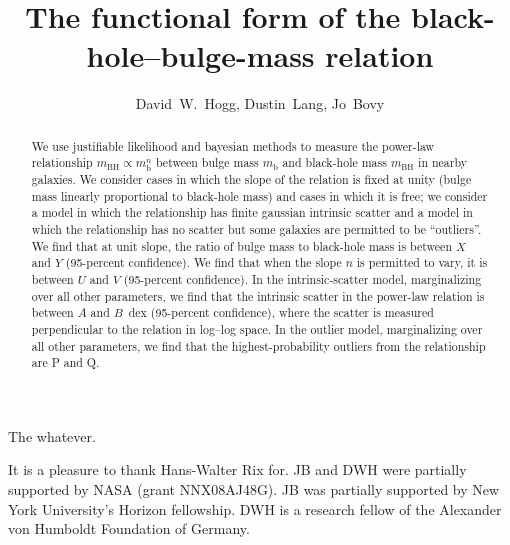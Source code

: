 \documentclass[12pt,preprint]{aastex}
\newcounter{address}
\newcommand{\mbulge}{m_{\mathrm{b}}}
\newcommand{\mbh}{m_{\mathrm{BH}}}
\newcommand{\slope}{n}
\begin{document}
\title{The functional form of the black-hole--bulge-mass relation}
\author{David~W.~Hogg\altaffilmark{\ref{CCPP},\ref{MPIA},\ref{email}},
        Dustin~Lang\altaffilmark{\ref{UofT},\ref{Princeton}},
        Jo~Bovy\altaffilmark{\ref{CCPP}}}

\begin{abstract}
We use justifiable likelihood and bayesian methods to measure the
power-law relationship $\mbh\propto\mbulge^\slope$ between bulge mass
$\mbulge$ and black-hole mass $\mbh$ in nearby galaxies.  We consider
cases in which the slope of the relation is fixed at unity (bulge mass
linearly proportional to black-hole mass) and cases in which it is
free; we consider a model in which the relationship has finite
gaussian intrinsic scatter and a model in which the relationship has
no scatter but some galaxies are permitted to be ``outliers''.  We
find that at unit slope, the ratio of bulge mass to black-hole mass is
between $X$ and $Y$ (95-percent confidence).  We find that when the
slope $\slope$ is permitted to vary, it is between $U$ and $V$
(95-percent confidence).  In the intrinsic-scatter model,
marginalizing over all other parameters, we find that the intrinsic
scatter in the power-law relation is between $A$ and $B$~dex
(95-percent confidence), where the scatter is measured perpendicular
to the relation in log--log space.  In the outlier model,
marginalizing over all other parameters, we find that the
highest-probability outliers from the relationship are P and Q.
\end{abstract}

The whatever.

\acknowledgments It is a pleasure to thank Hans-Walter Rix for. JB and
DWH were partially supported by NASA (grant NNX08AJ48G).  JB was
partially supported by New York University's Horizon fellowship.  DWH
is a research fellow of the Alexander von Humboldt Foundation of
Germany.
\end{document}

